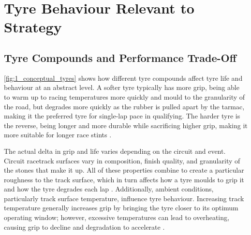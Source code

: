 \section{Tyre Behaviour Relevant to Strategy}
\label{sec:tyre-behaviour-background}


\subsection{Tyre Compounds and Performance Trade-Off}
\label{subsec:tyre-compounds}

%

 \cref{fig:1_conceptual_tyres} shows how different tyre compounds affect tyre life and behaviour at an abstract level. A softer tyre typically has more grip, being able to warm up to racing temperatures more quickly and mould to the granularity of the road, but degrades more quickly as the rubber is pulled apart by the tarmac, making it the preferred tyre for single-lap pace in qualifying. The harder tyre is the reverse, being longer and more durable while sacrificing higher grip, making it more suitable for longer race stints \cite{RaceTeq2024TyreDegradation,Taylor2020FrictionRacingTyres,RacecarEngineering2020TyreGrip}.



 The actual delta in grip and life varies depending on the circuit and event. Circuit racetrack surfaces vary in composition, finish quality, and granularity of the stones that make it up. All of these properties combine to create a particular roughness to the track surface, which in turn affects how a tyre moulds to grip it and how the tyre degrades each lap \cite{RacecarEngineering2020TyreGrip}. Additionally, ambient conditions, particularly track surface temperature, influence tyre behaviour. Increasing track temperature generally increases grip by bringing the tyre closer to its optimum operating window; however, excessive temperatures can lead to overheating, causing grip to decline and degradation to accelerate \cite{RacecarEngineering2008EssenceGrip}. 

